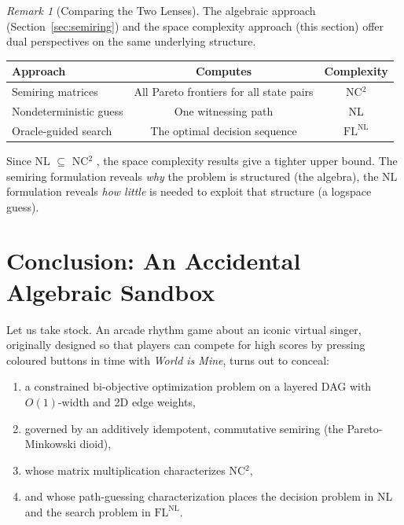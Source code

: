 \documentclass[11pt, letterpaper]{article}
\theoremstyle{definition}
\theoremstyle{remark}
\newtheorem{remark}[theorem]{Remark}
\begin{document}
\begin{remark}[Comparing the Two Lenses]
The algebraic approach (Section~\ref{sec:semiring}) and the space complexity approach (this section) offer dual perspectives on the same underlying structure.

\begin{center}
\begin{tabular}{lcc}
\toprule
\textbf{Approach} & \textbf{Computes} & \textbf{Complexity} \\
\midrule
Semiring matrices & All Pareto frontiers for all state pairs & NC$^2$ \\
Nondeterministic guess & One witnessing path & NL \\
Oracle-guided search & The optimal decision sequence & $\mathrm{FL^{NL}}$ \\
\bottomrule
\end{tabular}
\end{center}

Since NL $\subseteq$ NC$^2$ \cite{Cook1985}, the space complexity results give a tighter upper bound.
The semiring formulation reveals \emph{why} the problem is structured (the algebra), the NL formulation reveals \emph{how little} is needed to exploit that structure (a logspace guess).
\end{remark}

\section{Conclusion: An Accidental Algebraic Sandbox}

Let us take stock.
An arcade rhythm game about an iconic virtual singer, originally designed so that players can compete for high scores by pressing coloured buttons in time with \textit{World is Mine}, turns out to conceal:
\begin{enumerate}
    \item a constrained bi-objective optimization problem on a layered DAG with $O(1)$-width and 2D edge weights,
    \item governed by an additively idempotent, commutative semiring (the Pareto-Minkowski dioid),
    \item whose matrix multiplication characterizes NC$^2$,
    \item and whose path-guessing characterization places the decision problem in NL and the search problem in $\mathrm{FL}^{\mathrm{NL}}$.
\end{enumerate}
\end{document}
